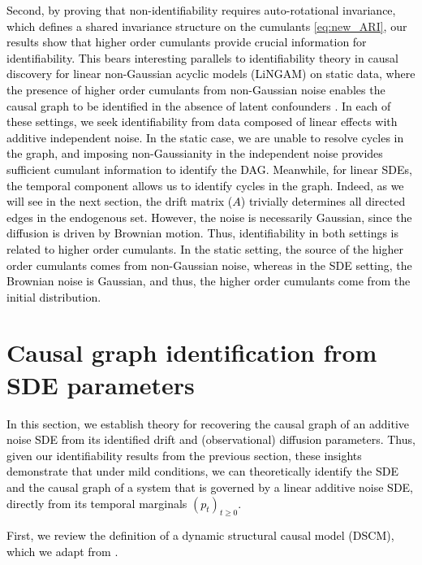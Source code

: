 \documentclass[twoside,11pt]{article}
\newcommand{\rv}[1]{\textcolor{black}{#1}}
\begin{document}
\rv{Second, by proving that non-identifiability requires auto-rotational invariance, which defines a shared invariance structure on the cumulants \eqref{eq:new_ARI}, our results show that higher order cumulants provide crucial information for identifiability. This bears interesting parallels to identifiability theory in causal discovery for linear non-Gaussian acyclic models (LiNGAM) on static data, where the presence of higher order cumulants from non-Gaussian noise enables the causal graph to be identified in the absence of latent confounders \citep{shimizu2006linear}. In each of these settings, we seek identifiability from data composed of linear effects with additive independent noise. In the static case, we are unable to resolve cycles in the graph, and imposing non-Gaussianity in the independent noise provides sufficient cumulant information to identify the DAG. Meanwhile, for linear SDEs, the temporal component allows us to identify cycles in the graph. Indeed, as we will see in the next section, the drift matrix ($A$) trivially determines all directed edges in the endogenous set. However, the noise is necessarily Gaussian, since the diffusion is driven by Brownian motion. Thus, identifiability in both settings is related to higher order cumulants. In the static setting, the source of the higher order cumulants comes from non-Gaussian noise, whereas in the SDE setting, the Brownian noise is Gaussian, and thus, the higher order cumulants come from the initial distribution.}

\section{Causal graph identification from SDE parameters}
\label{sec:causal_graph}

\rv{In this section, we establish theory for recovering the causal graph of an additive noise SDE from its identified drift and (observational) diffusion parameters. Thus, given our identifiability results from the previous section, these insights demonstrate that under mild conditions, we can theoretically identify the SDE and the causal graph of a system that is governed by a linear additive noise SDE, directly from its temporal marginals $(p_t)_{t \ge 0}$.}

\rv{
First, we review the definition of a dynamic structural causal model (DSCM), which we adapt from \citet[Definition 1]{boeken2024dynamic}.}
\end{document}
